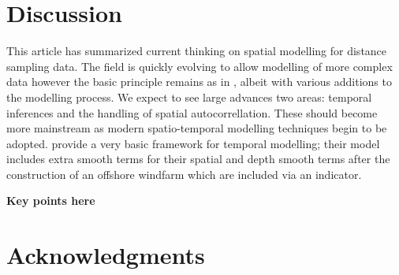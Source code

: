 \documentclass[a4paper,12pt]{article}
\begin{document}
\section*{Discussion}
\label{s:discussion}

This article has summarized current thinking on spatial modelling for distance sampling data. The field is quickly evolving to allow modelling of more complex data however the basic principle remains as in \cite{Hedley:2004et}, albeit with various additions to the modelling process. We expect to see large advances two areas: temporal inferences and the handling of spatial autocorrellation. These should become more mainstream as modern spatio-temporal modelling techniques begin to be adopted. \cite{Petersen:2011vy} provide a very basic framework for temporal modelling; their model includes extra smooth terms for their spatial and depth smooth terms after the construction of an offshore windfarm which are included via an indicator.

\textbf{Key points here}



%
%

\section*{Acknowledgments}
\end{document}
